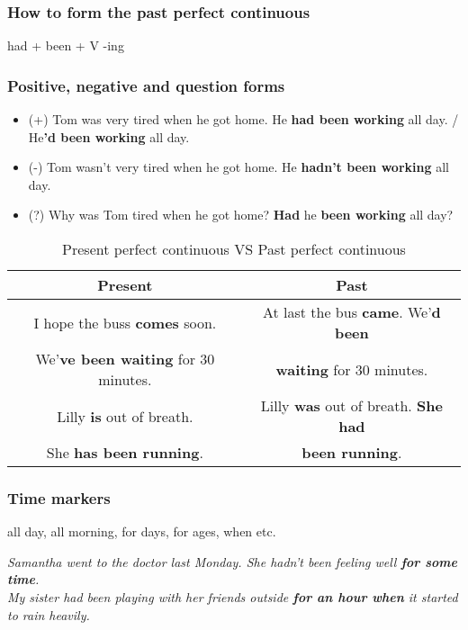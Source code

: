 \documentclass[hidelinks,10pt,a4paper]{article}
\begin{document}
\subsubsection{How to form the past perfect continuous}
had + been + V -ing

\subsubsection{Positive, negative and question forms}
\begin{itemize}
	\item (+) Tom was very tired when he got home. He \textbf{had been working} all day. / He\textbf{'d been working} all day.
	\item (-) Tom wasn't very tired when he got home. He \textbf{hadn't been working} all day.
	\item (?) Why was Tom tired when he got home? \textbf{Had} he \textbf{been working} all day?
\end{itemize}

\begin{table}[h]
\begin{center}
\begin{tabular}{|c|c|}
	\hline
	\textbf{Present} & \textbf{Past} \\ \hline
	I hope the buss \textbf{comes} soon. & At last the bus \textbf{came}. We'\textbf{d been} \\
	We'\textbf{ve been waiting} for 30 minutes. &  \textbf{waiting} for 30 minutes. \\ \hline
	Lilly \textbf{is} out of breath. & Lilly \textbf{was} out of breath. \textbf{She had} \\
	She \textbf{has been running}. & \textbf{been running}. \\ \hline
\end{tabular}
\end{center}
\caption{Present perfect continuous VS Past perfect continuous} \label{tab:ppvspp}
\end{table}

\subsubsection{Time markers}
all day, all morning, for days, for ages, when etc.

\begin{center}
	\textit{Samantha went to the doctor last Monday. She hadn't been feeling well \textbf{for some time}.\\
	My sister had been playing with her friends outside \textbf{for an hour when} it started to rain heavily.}
\end{center}
\end{document}

